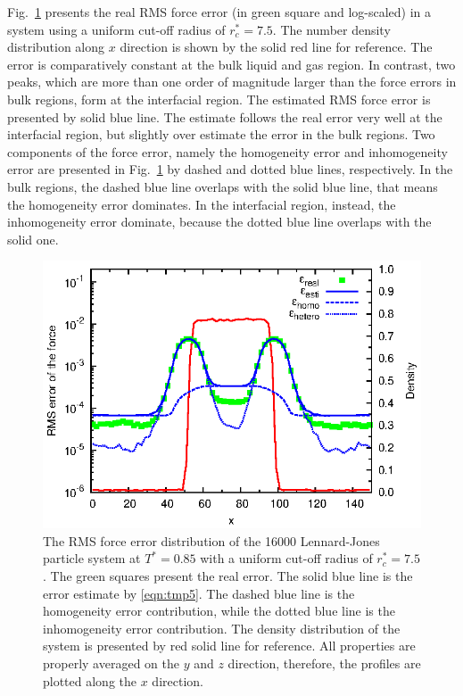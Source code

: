 \documentclass[aps,pre,preprint]{revtex4-1}
\begin{document}
Fig.~\ref{fig:tmp2} presents the real RMS force error (in green
square and log-scaled) in a system using a uniform cut-off radius of $r_c^\ast =
7.5$. The number density distribution along $x$ direction is shown by
the solid red line for reference.  The error is comparatively constant
at the bulk liquid and gas region. In contrast, two peaks, which are
more than one order of magnitude larger than the force errors in bulk
regions, form at the interfacial region.  The estimated RMS force
error is presented by solid blue line.  The estimate follows the real
error very well at the interfacial region, but slightly over estimate
the error in the bulk regions.  Two components of the force error,
namely the homogeneity error and inhomogeneity error are presented in
Fig.~\ref{fig:tmp2} by dashed and dotted blue lines, respectively.  In
the bulk regions, the dashed blue line overlaps with the solid blue
line, that means the homogeneity error dominates.  In the interfacial
region, instead, the inhomogeneity error dominate, because the
dotted blue line overlaps with the solid one.

\begin{figure}
  \centering
  \includegraphics[]{fig/t0.85-n16000-rc07.5uni/error.uniform.eps}
  \caption{The RMS force error distribution of the 16000 Lennard-Jones
    particle system at $T^\ast=0.85$ with a uniform cut-off radius of
    $r_c^\ast = 7.5$. The green squares present the real error. The
    solid blue line is the error estimate by \eqref{eqn:tmp5}. The
    dashed blue line is the homogeneity error contribution, while the
    dotted blue line is the inhomogeneity error contribution. The
    density distribution of the system is presented by red solid line
    for reference.  All properties are properly averaged on the $y$
    and $z$ direction, therefore, the profiles are plotted along the
    $x$ direction.  }
  \label{fig:tmp2}
\end{figure}
\end{document}
